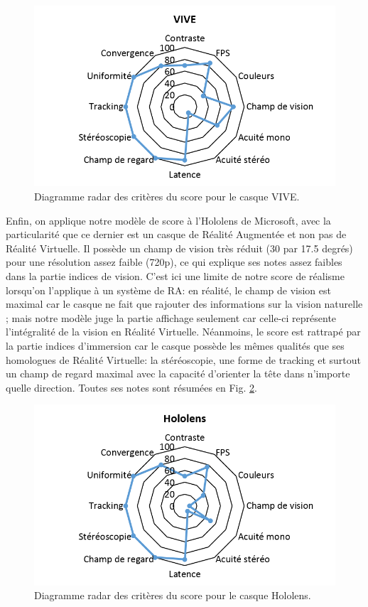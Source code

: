 \begin{figure}
	\centering
	\includegraphics[scale=1]{Figures/RadarScoreVIVE}
	\caption{Diagramme radar des critères du score pour le casque VIVE.}
	\label{fig:radar_score_vive}
\end{figure}

\par Enfin, on applique notre modèle de score à l'Hololens de Microsoft, avec la particularité que ce dernier est un casque de Réalité Augmentée et non pas de Réalité Virtuelle. Il possède un champ de vision très réduit (30 par 17.5 degrés) pour une résolution assez faible (720p), ce qui explique ses notes assez faibles dans la partie indices de vision. C'est ici une limite de notre score de réalisme lorsqu'on l'applique à un système de RA: en réalité, le champ de vision est maximal car le casque ne fait que rajouter des informations sur la vision naturelle ; mais notre modèle juge la partie affichage seulement car celle-ci représente l'intégralité de la vision en Réalité Virtuelle. Néanmoins, le score est rattrapé par la partie indices d'immersion car le casque possède les mêmes qualités que ses homologues de Réalité Virtuelle: la stéréoscopie, une forme de tracking et surtout un champ de regard maximal avec la capacité d'orienter la tête dans n'importe quelle direction. Toutes ses notes sont résumées en Fig. \ref{fig:radar_score_hololens}.

\begin{figure}
	\centering
	\includegraphics[scale=1]{Figures/RadarScoreHololens}
	\caption{Diagramme radar des critères du score pour le casque Hololens.}
	\label{fig:radar_score_hololens}
\end{figure}

